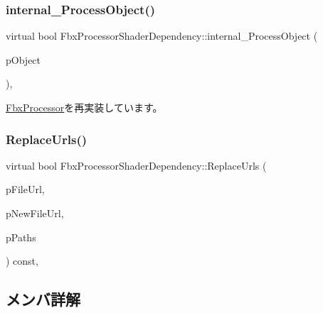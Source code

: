 \subsubsection{\texorpdfstring{internal\+\_\+\+Process\+Object()}{internal\_ProcessObject()}}
{\footnotesize\ttfamily virtual bool Fbx\+Processor\+Shader\+Dependency\+::internal\+\_\+\+Process\+Object (\begin{DoxyParamCaption}\item[{\hyperlink{class_fbx_object}{Fbx\+Object} $\ast$}]{p\+Object }\end{DoxyParamCaption})\hspace{0.3cm}{\ttfamily [protected]}, {\ttfamily [virtual]}}



\hyperlink{class_fbx_processor_ac549e7e8c678383831be8789a7c4ccdb}{Fbx\+Processor}を再実装しています。

\mbox{\label{class_fbx_processor_shader_dependency_a7b9462bad22d6a5c41474ea4761a2b0e}} 
\subsubsection{\texorpdfstring{Replace\+Urls()}{ReplaceUrls()}}
{\footnotesize\ttfamily virtual bool Fbx\+Processor\+Shader\+Dependency\+::\+Replace\+Urls (\begin{DoxyParamCaption}\item[{const \hyperlink{class_fbx_string}{Fbx\+String} \&}]{p\+File\+Url,  }\item[{const \hyperlink{class_fbx_string}{Fbx\+String} \&}]{p\+New\+File\+Url,  }\item[{const \hyperlink{class_fbx_processor_shader_dependency_a52e467804857e767f194d73000b08f39}{File\+Path\+List} \&}]{p\+Paths }\end{DoxyParamCaption}) const\hspace{0.3cm}{\ttfamily [protected]}, {\ttfamily [virtual]}}



\subsection{メンバ詳解}
\mbox{\label{class_fbx_processor_shader_dependency_a2ee0459a8761ec48aa6943cc90442b6a}} 

